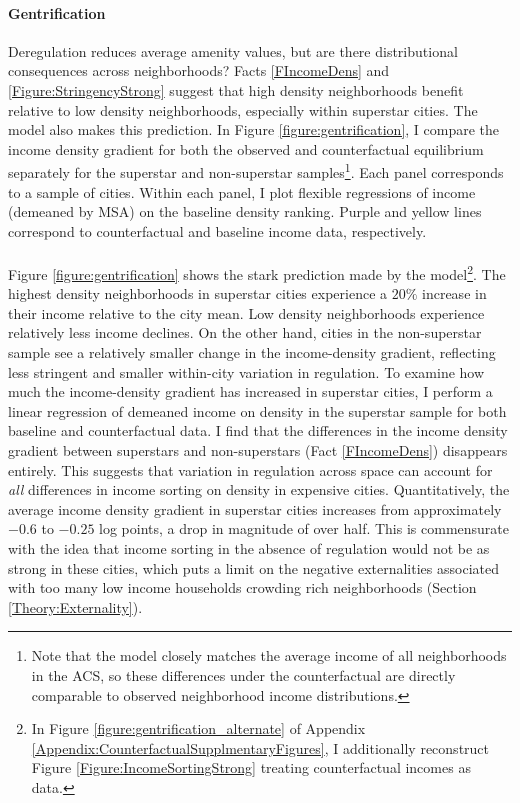 \documentclass[12pt]{article}
\begin{document}
\paragraph*{Gentrification} Deregulation reduces average amenity values, but are there distributional consequences across neighborhoods? Facts \ref{FIncomeDens} and \ref{Figure:StringencyStrong} suggest that high density neighborhoods benefit relative to low density neighborhoods, especially within superstar cities. The model also makes this prediction. In Figure \ref{figure:gentrification}, I compare the income density gradient for both the observed and counterfactual equilibrium separately for the superstar and non-superstar samples\footnote{Note that the model closely matches the average income of all neighborhoods in the ACS, so these differences under the counterfactual are directly comparable to observed neighborhood income distributions.}. Each panel corresponds to a sample of cities. Within each panel, I plot flexible regressions of income (demeaned by MSA) on the baseline density ranking. Purple and yellow lines correspond to counterfactual and baseline income data, respectively.

\paragraph*{}
Figure \ref{figure:gentrification} shows the stark prediction made by the model\footnote{In Figure \ref{figure:gentrification_alternate} of Appendix \ref{Appendix:CounterfactualSupplmentaryFigures}, I additionally reconstruct Figure \ref{Figure:IncomeSortingStrong} treating counterfactual incomes as data.}. The highest density neighborhoods in superstar cities experience a $20\%$ increase in their income relative to the city mean. Low density neighborhoods experience relatively less income declines. On the other hand, cities in the non-superstar sample see a relatively smaller change in the income-density gradient, reflecting less stringent and smaller within-city variation in regulation. To examine how much the income-density gradient has increased in superstar cities, I perform a linear regression of demeaned income on density in the superstar sample for both baseline and counterfactual data. I find that the differences in the income density gradient between superstars and non-superstars (Fact \ref{FIncomeDens}) disappears entirely. This suggests that variation in regulation across space can account for \textit{all} differences in income sorting on density in expensive cities. Quantitatively, the average income density gradient in superstar cities increases from approximately $-0.6$ to $-0.25$ log points, a drop in magnitude of over half. This is commensurate with the idea that income sorting in the absence of regulation would not be as strong in these cities, which puts a limit on the negative externalities associated with too many low income households crowding rich neighborhoods (Section \ref{Theory:Externality}). 
\end{document}
